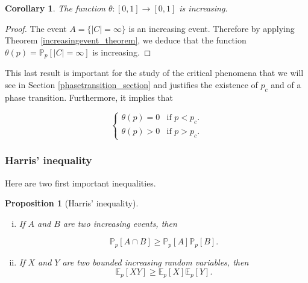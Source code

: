 \documentclass[a4paper,11pt]{article}
\theoremstyle{plain}
\newtheorem{corollary}[theorem]{Corollary}
\newtheorem{proposition}[theorem]{Proposition}
\theoremstyle{definition}
\theoremstyle{remark}
\begin{document}
\begin{corollary}
  The function $\theta : [0,1] \longrightarrow [0,1]$ is increasing.
\end{corollary}
\begin{proof}
The event $A = \{ |C| = \infty \}$ is an increasing event. Therefore by applying Theorem \ref{increasingevent_theorem}, we deduce that the function $\theta(p) = \mathbb{P}_p[|C| = \infty]$ is increasing.
\end{proof}

This last result is important for the study of the critical phenomena that we will see in Section \ref{phasetransition_section} and justifies the existence of $p_c$ and of a phase transition. Furthermore, it implies that

\[
\left\{
    \begin{array}{ll}
        \theta(p) = 0 & \text{if $p < p_c$}.\\
        \theta(p) > 0 & \text{if $p > p_c$}.
    \end{array}
\right.
\]

\subsubsection{Harris' inequality}

Here are two first important inequalities.
\begin{proposition}[Harris' inequality]

\begin{enumerate}[(i)]
\text{}
\item If $A$ and $B$ are two increasing events, then

\[ \mathbb{P}_p[A \cap B] \geq \mathbb{P}_p[A]\mathbb{P}_p[B]. \]

\item If $X$ and $Y$ are two bounded increasing random variables, then
\[ \mathbb{E}_p[XY] \geq \mathbb{E}_p[X]\mathbb{E}_p[Y]. \]
\end{enumerate}
\end{proposition}
\end{document}
